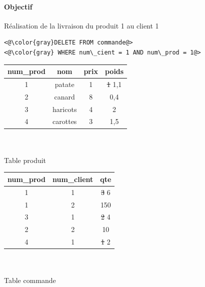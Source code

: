 \paragraph{Objectif} Réalisation de la livraison du produit 1 au client 1

\begin{lstlisting}
<@\color{gray}DELETE FROM commande@>
<@\color{gray} WHERE num\_cient = 1 AND num\_prod = 1@>
\end{lstlisting}

\begin{minipage}{0.5\linewidth}
	\begin{center}
		\begin{tabular}{|c|c|c|c|}
			\multicolumn{1}{c}{num\_prod} & \multicolumn{1}{c}{nom} & \multicolumn{1}{c}{prix} & \multicolumn{1}{c}{poids} \\ \hline
			\rowcolor{gray} 1 & patate & 1 & \sout{1} \color{red} 1,1 \\ \hline 
			2 & canard & 8 & 0,4 \\ \hline
			3 & haricots & 4 & 2 \\ \hline
			4 & carottes & 3 & 1,5 \\ \hline
		\end{tabular}\\ \enspace \\
		Table produit
	\end{center}
\end{minipage}
\begin{minipage}{0.5\linewidth}
	\begin{center}
		\begin{tabular}{|c|c|c|}
			\multicolumn{1}{c}{num\_prod} & \multicolumn{1}{c}{num\_client} & \multicolumn{1}{c}{qte}  \\ \hline
			1 & 1 & \sout 3  \color{blue} 6\\ \hline 
			1 & 2 & 150 \\  \hline
			3 & 1 & \sout 2 \color{blue} 4 \\ \hline
			\color{green} 2 & \color{green} 2 & \color{green} 10\\ \hline
			\color{green} 4 & \color{green} 1 & \sout{\color{green} 1} \color{blue} 2 \\ \hline
		\end{tabular}\\\enspace\\
		Table commande
	\end{center}
\end{minipage}

